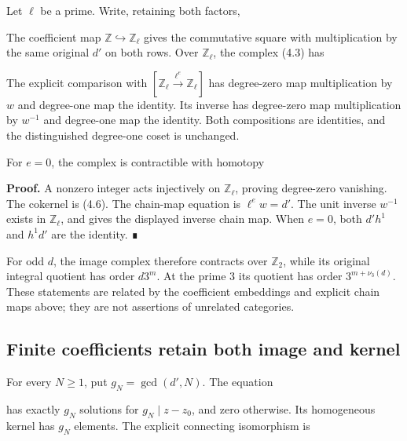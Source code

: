 Let \(\ell\) be a prime. Write, retaining both factors,


The coefficient map \(\mathbb Z\hookrightarrow\mathbb Z_\ell\) gives the
commutative square with multiplication by the same original \(d'\) on
both rows. Over \(\mathbb Z_\ell\), the complex (4.3) has


The explicit comparison with
\([\mathbb Z_\ell\xrightarrow{\ell^e}\mathbb Z_\ell]\) has degree-zero
map multiplication by \(w\) and degree-one map the identity. Its inverse
has degree-zero map multiplication by \(w^{-1}\) and degree-one map the
identity. Both compositions are identities, and the distinguished
degree-one coset is unchanged.

For \(e=0\), the complex is contractible with homotopy


\textbf{Proof.} A nonzero integer acts injectively on
\(\mathbb Z_\ell\), proving degree-zero vanishing. The cokernel is
(4.6). The chain-map equation is \(\ell^e w=d'\). The unit inverse
\(w^{-1}\) exists in \(\mathbb Z_\ell\), and gives the displayed inverse
chain map. When \(e=0\), both \(d'h^1\) and \(h^1d'\) are the identity.
∎

For odd \(d\), the image complex therefore contracts over
\(\mathbb Z_2\), while its original integral quotient has order
\(d3^m\). At the prime 3 its quotient has order \(3^{m+\nu_3(d)}\).
These statements are related by the coefficient embeddings and explicit
chain maps above; they are not assertions of unrelated categories.

\subsection{Finite coefficients retain both image and kernel}

For every \(N\ge1\), put \(g_N=\gcd(d',N)\). The equation


has exactly \(g_N\) solutions for \(g_N\mid z-z_0\), and zero otherwise.
Its homogeneous kernel has \(g_N\) elements. The explicit connecting
isomorphism is


